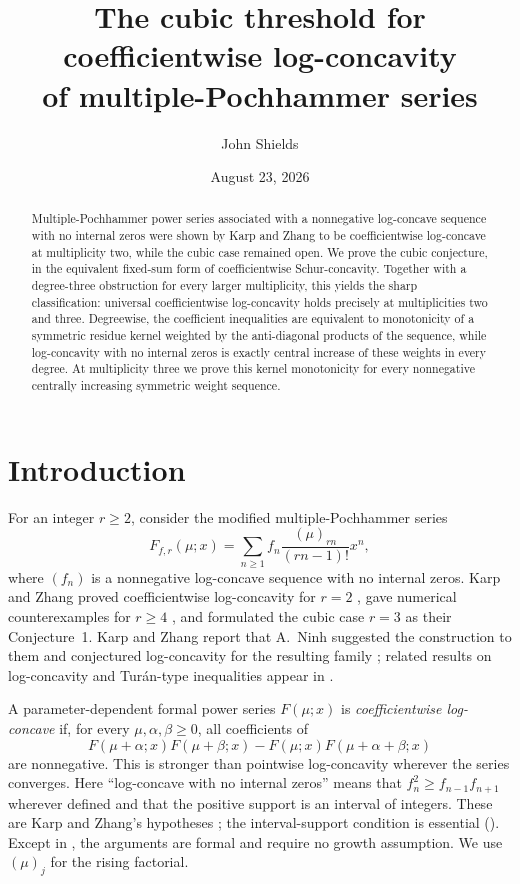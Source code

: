 \documentclass[11pt,a4paper]{amsart}
\title[Cubic threshold for multiple-Pochhammer log-concavity]
{The cubic threshold for coefficientwise log-concavity\\
of multiple-Pochhammer series}
\author{John Shields}
\date{August 23, 2026}
\numberwithin{equation}{section}
\theoremstyle{plain}
\theoremstyle{definition}
\begin{document}
\begin{abstract}
Multiple-Pochhammer power series associated with a nonnegative log-concave sequence with no internal zeros
were shown by Karp and Zhang to be coefficientwise log-concave at multiplicity two,
while the cubic case remained open.  We prove the cubic conjecture, in the equivalent
fixed-sum form of coefficientwise Schur-concavity.  Together with a degree-three
obstruction for every larger multiplicity, this yields the sharp classification:
universal coefficientwise log-concavity holds precisely at multiplicities two and
three.  Degreewise, the coefficient inequalities are equivalent to monotonicity of a
symmetric residue kernel weighted by the anti-diagonal products of the sequence, while
log-concavity with no internal zeros is exactly central increase of these weights in
every degree.  At multiplicity three we prove this kernel monotonicity for every
nonnegative centrally increasing symmetric weight sequence.
\end{abstract}

\maketitle

\section{Introduction}\label{sec:introduction}

For an integer \(r\ge2\), consider the modified multiple-Pochhammer series
\begin{equation}\label{eq:general-r}
 F_{f,r}(\mu;x)
 =\sum_{n\ge1}f_n\frac{(\mu)_{rn}}{(rn-1)!}x^n,
\end{equation}
where \((f_n)\) is a nonnegative log-concave sequence with no internal zeros.  Karp
and Zhang proved coefficientwise log-concavity for \(r=2\)
\cite[Thm.~2]{KarpZhang2024LogConcavity}, gave numerical counterexamples for
\(r\ge4\) \cite[Rem.~5]{KarpZhang2024LogConcavity}, and formulated the cubic case
\(r=3\) as their Conjecture~1.  Karp and Zhang report that A.~Ninh suggested the construction
to them and conjectured log-concavity for the resulting family
\cite[\S3]{KarpZhang2024LogConcavity}; related results on log-concavity and
Tur\'an-type inequalities appear in
\cite{KalmykovKarp2013Reciprocal,KalmykovKarp2013Ratios,KarpSitnik2010LogConvexity,NinhPham2025LogConcavity}.

A parameter-dependent formal power series \(F(\mu;x)\) is
\emph{coefficientwise log-concave} if, for every \(\mu,\alpha,\beta\ge0\), all
coefficients of
\[
 F(\mu+\alpha;x)F(\mu+\beta;x)
 -F(\mu;x)F(\mu+\alpha+\beta;x)
\]
are nonnegative.  This is stronger than pointwise log-concavity wherever the series
converges.  Here ``log-concave with no internal zeros'' means that
\(f_n^2\ge f_{n-1}f_{n+1}\) wherever defined and that the positive support is an
interval of integers.  These are Karp and Zhang's hypotheses
\cite[Def.~1]{KarpZhang2024LogConcavity}; the interval-support condition is essential
().  Except in , the arguments are
formal and require no growth assumption.  We use \((\mu)_j\) for the rising
factorial.
\end{document}
